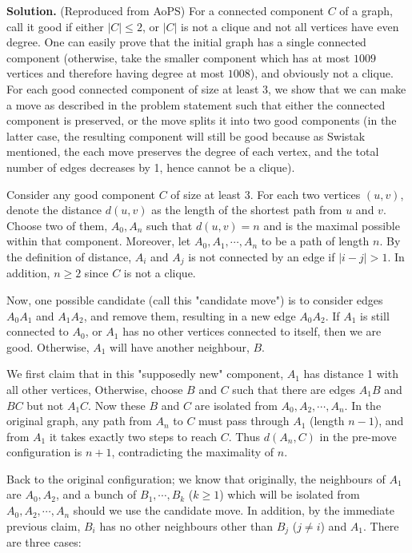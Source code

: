 \documentclass[11pt,a4paper]{article}
\begin{document}
\begin{enumerate}
	\textbf{Solution.} (Reproduced from AoPS) For a connected component $C$ of a graph, call it good if either $|C|\le 2$, or $|C|$ is not a clique and not all vertices have even degree. One can easily prove that the initial graph has a single connected component (otherwise, take the smaller component which has at most $1009$ vertices and therefore having degree at most $1008$), and obviously not a clique. For each good connected component of size at least 3, we show that we can make a move as described in the problem statement such that either the connected component is preserved, or the move splits it into two good components (in the latter case, the resulting component will still be good because as Swistak mentioned, the each move preserves the degree of each vertex, and the total number of edges decreases by 1, hence cannot be a clique).
	
	Consider any good component $C$ of size at least 3. For each two vertices $(u, v)$, denote the distance $d(u, v)$ as the length of the shortest path from $u$ and $v$. Choose two of them, $A_0, A_n$ such that $d(u, v)=n$ and is the maximal possible within that component. Moreover, let $A_0, A_1, \cdots , A_n$ to be a path of length $n$. By the definition of distance, $A_i$ and $A_j$ is not connected by an edge if $|i-j|>1$. In addition, $n\ge 2$ since $C$ is not a clique.
	
	Now, one possible candidate (call this "candidate move") is to consider edges $A_0A_1$ and $A_1A_2$, and remove them, resulting in a new edge $A_0A_2$. If $A_1$ is still connected to $A_0$, or $A_1$ has no other vertices connected to itself, then we are good. Otherwise, $A_1$ will have another neighbour, $B$.
	
	We first claim that in this "supposedly new" component, $A_1$ has distance 1 with all other vertices, Otherwise, choose $B$ and $C$ such that there are edges $A_1B$ and $BC$ but not $A_1C$. Now these $B$ and $C$ are isolated from $A_0, A_2, \cdots , A_n$. In the original graph, any path from $A_n$ to $C$ must pass through $A_1$ (length $n-1$), and from $A_1$ it takes exactly two steps to reach $C$. Thus $d(A_n, C)$ in the pre-move configuration is $n+1$, contradicting the maximality of $n$.
	
	Back to the original configuration; we know that originally, the neighbours of $A_1$ are $A_0, A_2$, and a bunch of $B_1, \cdots, B_k$ ($k\ge 1$) which will be isolated from $A_0, A_2, \cdots , A_n$ should we use the candidate move. In addition, by the immediate previous claim, $B_i$ has no other neighbours other than $B_j$ ($j\neq i$) and $A_1$. There are three cases:
	

\end{enumerate}
\end{document}
